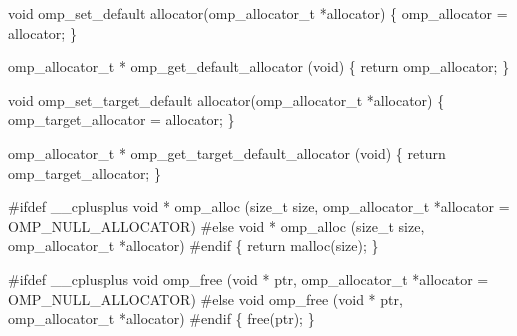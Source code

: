 {\begin{codepar}
void omp\_set\_default allocator(omp\_allocator\_t *allocator)
\{
     omp\_allocator = allocator;
\}

omp\_allocator\_t * omp\_get\_default\_allocator (void)
\{
    return omp\_allocator;
\}

void omp\_set\_target\_default allocator(omp\_allocator\_t *allocator)
\{
     omp\_target\_allocator = allocator;
\}

omp\_allocator\_t * omp\_get\_target\_default\_allocator (void)
\{
    return omp\_target\_allocator;
\}

\#ifdef _\_cplusplus
void * omp\_alloc (size\_t size, omp\_allocator\_t *allocator = OMP\_NULL\_ALLOCATOR)
\#else
void * omp\_alloc (size\_t size, omp\_allocator\_t *allocator)
\#endif
\{
    return malloc(size);
\}

\#ifdef _\_cplusplus
void omp\_free (void * ptr, omp\_allocator\_t *allocator = OMP\_NULL\_ALLOCATOR)
\#else
void omp\_free (void * ptr, omp\_allocator\_t *allocator)
\#endif
\{
    free(ptr);
\}

\end{codepar}} %

